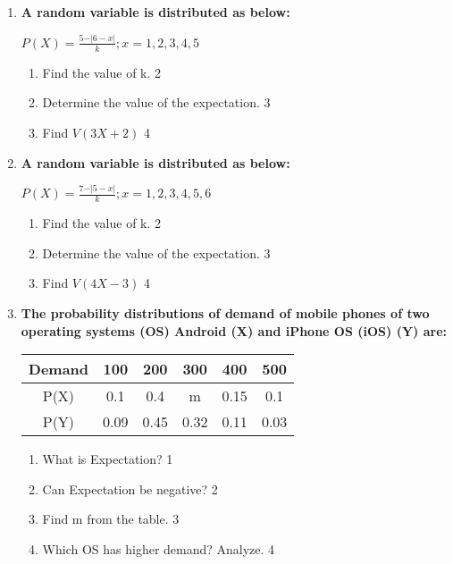 \documentclass[a4paper,oneside, margin=1.4in]{book}
\begin{document}
\begin{enumerate}
  \item \textbf{A random variable is distributed as below:}

\begin{center}
  \textbf{$P(X) = \frac{5-\vert 6-x\vert}{k}; x=1,2,3,4,5$}
\end{center}

\begin{enumerate}
  \item
  	Find the value of k. \hfill 2
  \item
  	Determine the value of the expectation. \hfill 3
  \item
  	Find $V(3X+2)$ \hfill 4
\end{enumerate}

\item \textbf{A random variable is distributed as below:}

\begin{center}
  \textbf{$P(X) = \frac{7-\vert 5-x\vert}{k}; x=1,2,3,4,5,6$}
\end{center}

\begin{enumerate}
  \item
  	Find the value of k. \hfill 2
  \item
  	Determine the value of the expectation. \hfill 3
  \item
  	Find $V(4X-3)$ \hfill 4
\end{enumerate}

  
   \item
	  \textbf{The probability distributions of demand of mobile phones of two 
	  operating systems (OS) Android (X) and iPhone OS (iOS) (Y) are:} 
	  
	    \begin{table}[h]
	    	  \begin{center}
\begin{tabular}{c|c|c|c|c|c}
Demand & 100  & 200  & 300  & 400  & 500  \\ \hline
P(X)   & 0.1  & 0.4  & m    & 0.15 & 0.1  \\ \hline
P(Y)   & 0.09 & 0.45 & 0.32 & 0.11 & 0.03
\end{tabular}
	  \end{center}
\end{table}
  
  \begin{enumerate}
    \item
	What is Expectation? \hfill 1
    \item
	Can Expectation be negative? \hfill 2
    \item  
	Find m from the table. \hfill 3
    \item
	Which OS has higher demand? Analyze. \hfill 4
  \end{enumerate}
  

\end{enumerate}
\end{document}
